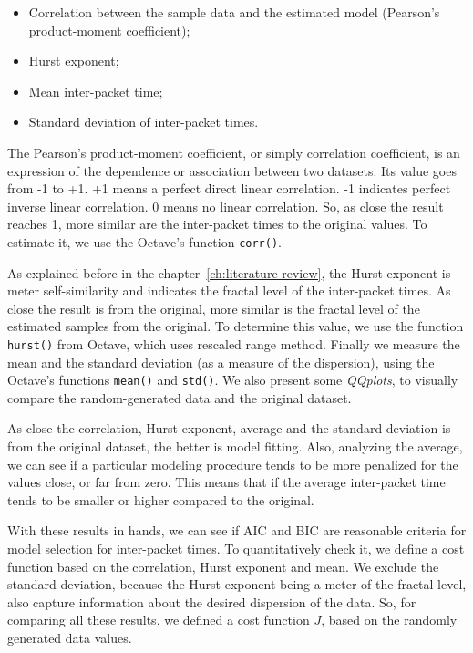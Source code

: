 \begin{itemize}
\item Correlation between the sample data and the estimated model (Pearson's product-moment coefficient);
\item Hurst exponent;
\item Mean inter-packet time;
\item Standard deviation of inter-packet times.
\end{itemize}

The Pearson's product-moment coefficient, or simply correlation coefficient,  is an expression of the dependence or association between two datasets. Its value goes from -1 to +1. +1 means a perfect direct linear correlation. -1 indicates perfect inverse linear correlation. 0 means no linear correlation. So, as close the result reaches 1, more similar are the inter-packet times to the original values. To estimate it, we use the Octave's function \texttt{corr()}.

As explained before in the chapter~\ref{ch:literature-review}, the Hurst exponent is meter self-similarity and indicates the fractal level of the inter-packet times. As close the result is from the original, more similar is the fractal level of the estimated samples from the original. To determine this value, we use the function \texttt{hurst()} from Octave, which uses rescaled range method.
Finally we measure the mean and the standard deviation (as a measure of the dispersion), using the Octave's functions \texttt{mean()} and \texttt{std()}. We also present some \textit{QQplots}, to visually compare the random-generated data and the original dataset. 

As close the correlation, Hurst exponent, average and the standard deviation is from the original dataset, the better is model fitting. Also, analyzing the average, we can see if a particular modeling procedure tends to be more penalized for the values close, or far from zero. This means that if the average inter-packet time tends to be smaller or higher compared to the original. 

With these results in hands, we can see if AIC and BIC are reasonable criteria for model selection for inter-packet times. To quantitatively check it, we define a cost function based on the correlation, Hurst exponent and mean. We exclude the standard deviation, because the Hurst exponent being a meter of the fractal level, also capture information about the desired dispersion of the data. So, for comparing all these results, we defined a cost function $J$, based on the randomly generated data values.

